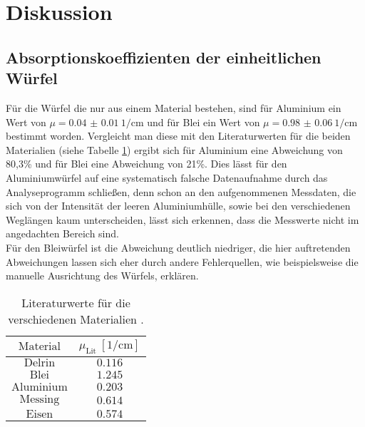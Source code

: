\newpage
\section{Diskussion}
\label{sec:Diskussion}
\subsection{Absorptionskoeffizienten der einheitlichen Würfel}
Für die Würfel die nur aus einem Material bestehen, sind für Aluminium ein Wert von $\mu=\SI{0.04(1)}{1\per\centi\meter}$ und für Blei ein Wert von $\mu=\SI{0.98(6)}{1\per\centi\meter}$
bestimmt worden. Vergleicht man diese mit den Literaturwerten für die beiden Materialien (siehe Tabelle \ref{tab:tablit}) ergibt sich für Aluminium eine Abweichung von 80,3\% und für
Blei eine Abweichung von 21\%. Dies lässt für den Aluminiumwürfel auf eine systematisch falsche Datenaufnahme durch das Analyseprogramm schließen, denn schon an den aufgenommenen Messdaten, die sich von der Intensität der leeren Aluminiumhülle, sowie bei den verschiedenen Weglängen kaum unterscheiden, lässt sich erkennen, dass die Messwerte nicht im angedachten Bereich sind.\\
Für den Bleiwürfel ist die Abweichung deutlich niedriger, die hier auftretenden Abweichungen lassen sich eher durch andere Fehlerquellen, wie beispielsweise die manuelle Ausrichtung des Würfels, erklären.
\begin{table}
  \centering
  \caption{Literaturwerte für die verschiedenen Materialien \cite{Anleitung3}.}
  \label{tab:tablit}
  \begin{tabular}{c c}
    \toprule
		$\mathrm{Material}$ & $\mu_\mathrm{Lit} \: [\si{1\per\centi\meter}]$ \\
    \midrule
    $\mathrm{Delrin}$ & $\num{0,116}$ \\
		$\mathrm{Blei}$ & $\num{1,245}$ \\
    $\mathrm{Aluminium}$ & $\num{0,203}$ \\
    $\mathrm{Messing}$ & $\num{0,614}$ \\
    $\mathrm{Eisen}$ & $\num{0,574}$ \\
    \bottomrule
  \end{tabular}
\end{table}
\FloatBarrier
